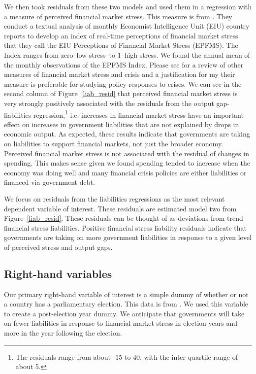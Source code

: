 \documentclass[]{article}
\begin{document}
We then took residuals from these two models and used them in a regression with a measure of perceived financial market stress. This measure is from \cite{gandrudHallEPFMS}. They conduct a textual analysis of monthly Economist Intelligence Unit (EIU) country reports to develop an index of real-time perceptions of financial market stress that they call the EIU Perceptions of Financial Market Stress (EPFMS). The Index ranges from zero--low stress--to 1--high stress. We found the annual mean of the monthly observations of the EPFMS Index. Please see \cite{gandrudHallEPFMS} for a review of other measures of financial market stress and crisis and a justification for my their measure is preferable for studying policy responses to crises. We can see in the second column of Figure~\ref{liab_resid} that perceived financial market stress is very strongly positively associated with the residuals from the output gap-liabilities regression,\footnote{The residuals range from about -15 to 40, with the inter-quartile range of about 5.} i.e. increases in financial market stress have an important effect on increases in government liabilities that are not explained by drops in economic output. As expected, these results indicate that governments are taking on liabilities to support financial markets, not just the broader economy. Perceived financial market stress is not associated with the residual of changes in spending. This makes sense given we found spending tended to increase when the economy was doing well and many financial crisis policies are either liabilities or financed via government debt.

We focus on residuals from the liabilities regressions as the most relevant dependent variable of interest. These residuals are estimated model two from Figure~\ref{liab_resid}. These residuals can be thought of as deviations from trend financial stress liabilities. Positive financial stress liability residuals indicate that governments are taking on more government liabilities in response to a given level of perceived stress and output gaps.

\subsection*{Right-hand variables}

Our primary right-hand variable of interest is a simple dummy of whether or not a country has a parliamentary election. This data is from \cite{Kayser2015comp}. We used this variable to create a post-election year dummy. We anticipate that governments will take on fewer liabilities in response to financial market stress in election years and more in the year following the election.
\end{document}
